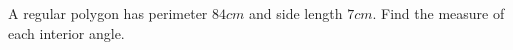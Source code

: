 A regular polygon has perimeter $84cm$ and side length $7cm$. Find the measure of each interior angle.
